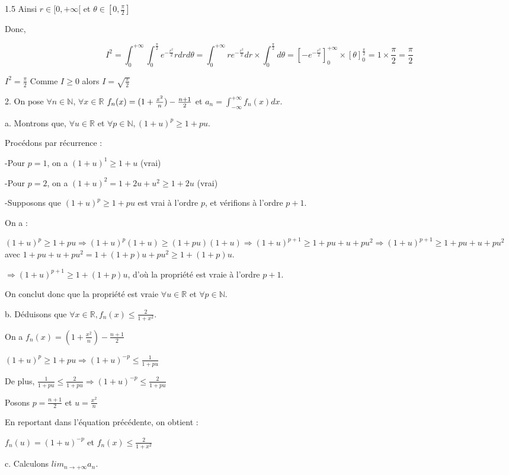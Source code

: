 \documentclass[12pt]{article}
\begin{document}
\begin{spacing}{1.5}
Ainsi $r\in [0, +\infty[$ et $\theta\in [0,\frac{\pi}{2}]$

Donc, 

\[
I^2=\int_0^{+\infty}\int_0^{\frac{\pi}{2}}e^{-\frac{r^2}{2}}rdrd\theta=\int_0^{+\infty}re^{-\frac{r^2}{2}}dr\times \int_0^{\frac{\pi}{2}}d\theta=[-e^{-\frac{r^2}{2}}]_0^{+\infty}\times [\theta]_0^{\frac{\pi}{2}}=1\times \frac{\pi}{2}=\frac{\pi}{2}\]

$I^2=\frac{\pi}{2}$ Comme $I\geq 0$ alors $I=\sqrt{\frac{\pi}{2}}$


2. On pose $\forall {n\in \mathbb{N}}$, $\forall {x\in \mathbb{R}}$ $\\
f_n(x)=(1+\frac{x^2}{n})-\frac{n+1}{2}$ et $a_n=\int_{-\infty}^{+\infty}f_n(x)dx.$

a. Montrons que, $\forall {u\in \mathbb{R}}$ et $\forall {p\in \mathbb{N}}, (1+u)^p\geq 1+pu$.

Procédons par récurrence :

-Pour $p=1$, on a $(1+u)^1\geqslant 1+u$ (vrai)

-Pour $p=2$, on a $(1+u)^2=1+2u+u^2\geq 1+2u$ (vrai)

-Supposons que $(1+u)^p\geq 1+pu$ est vrai à l'ordre $p$, et vérifions à l'ordre $p+1$.

On a :

$(1+u)^p\geq 1+pu\Rightarrow (1+u)^p(1+u)\geq (1+pu)(1+u)\Rightarrow (1+u)^{p+1}\geq 1+pu + u+pu^2\Rightarrow (1+u)^{p+1}\geq 1+pu + u+pu^2$ avec $1+pu + u+pu^2=1+(1+p)u+pu^2\geq 1+(1+p)u$.

$\Rightarrow (1+u)^{p+1}\geq 1+(1+p)u$, d'où la propriété est vraie à l'ordre $p+1$.

On conclut donc que la propriété est vraie $\forall {u\in \mathbb{R}}$ et $\forall {p\in \mathbb{N}}$.


b. Déduisons que $\forall {x\in \mathbb{R}}, f_n(x) \leq \frac{2}{1+x^2}$.

On a  $f_n(x)=(1+\frac{x^2}{n})-\frac{n+1}{2}$ 

$(1+u)^p\geq 1+pu\Longrightarrow (1+u)^{-p}\leq \frac{1}{1+pu}$

De plus, $\frac{1}{1+pu}\leq \frac{2}{1+pu}\Longrightarrow (1+u)^{-p}\leq \frac{2}{1+pu}$

Posons $p=\frac{n+1}{2}$ et $u=\frac{x^2}{n}$

En reportant dans l'équation précédente, on obtient : 

$f_n(u)=(1+u)^{-p}$ et $f_n(x)\leq\frac{2}{1+x^2}$

c. Calculons $lim_{n\to +\infty}a_n$.


\end{spacing}
\end{document}
